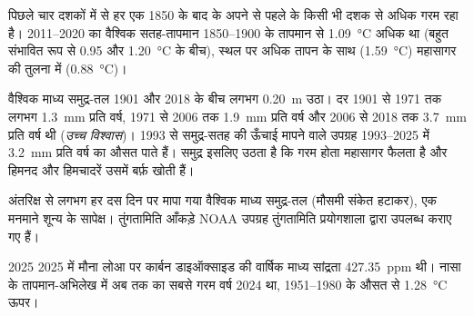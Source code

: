 \begin{proposition}[प्रेक्षित वैश्विक तापन]\label{prop:g12:climate-change:warming}
पिछले चार दशकों में से हर एक 1850 के बाद के अपने से पहले के किसी भी दशक से अधिक
गरम रहा है। 2011--2020 का वैश्विक सतह-तापमान 1850--1900 के तापमान से \qty{1.09}{\degreeCelsius}
अधिक था (बहुत संभावित रूप से 0.95 और
\qty{1.20}{\degreeCelsius} के बीच), स्थल पर अधिक तापन के साथ
(\qty{1.59}{\degreeCelsius}) महासागर की तुलना में (\qty{0.88}{\degreeCelsius})।
\end{proposition}

\begin{proposition}[समुद्र-तल अधिकाधिक तेज़ी से उठता है]\label{prop:g12:climate-change:sea}
वैश्विक माध्य समुद्र-तल 1901 और 2018 के बीच लगभग \qty{0.20}{m} उठा।
दर 1901 से 1971 तक लगभग \qty{1.3}{mm} प्रति वर्ष,
1971 से 2006 तक \qty{1.9}{mm} प्रति वर्ष और 2006 से
2018 तक \qty{3.7}{mm} प्रति वर्ष थी (\emph{उच्च विश्वास})। 1993 से समुद्र-सतह की
ऊँचाई मापने वाले उपग्रह
1993--2025 में \qty{3.2}{mm} प्रति वर्ष का औसत पाते हैं। समुद्र इसलिए उठता है कि गरम होता
महासागर फैलता है और हिमनद और हिमचादरें उसमें बर्फ़ खोती हैं।
\end{proposition}

\begin{omfigure}

{\small अंतरिक्ष से लगभग हर दस दिन पर मापा गया वैश्विक माध्य समुद्र-तल
(मौसमी संकेत हटाकर), एक मनमाने शून्य के सापेक्ष। तुंगतामिति आँकड़े
NOAA उपग्रह तुंगतामिति प्रयोगशाला द्वारा उपलब्ध कराए गए हैं।}
\end{omfigure}

\begin{dated}{2025}
2025 में मौना लोआ पर कार्बन डाइऑक्साइड की वार्षिक माध्य सांद्रता
\qty{427.35}{ppm} थी। नासा के तापमान-अभिलेख में अब तक का सबसे गरम वर्ष
2024 था, 1951--1980 के औसत से \qty{1.28}{\degreeCelsius} ऊपर।
\end{dated}

